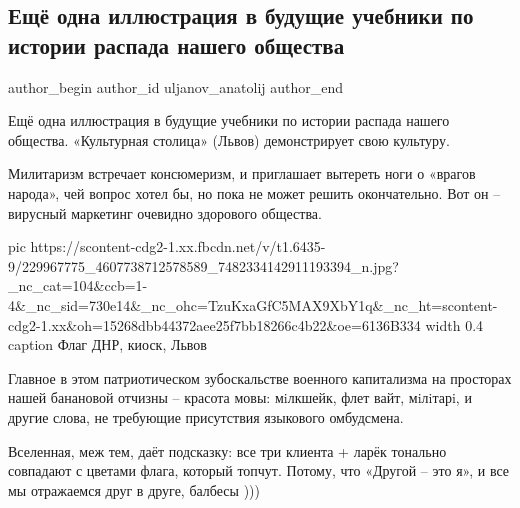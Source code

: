  
 
 
 
 
 
\subsection{Ещё одна иллюстрация в будущие учебники по истории распада нашего общества}
\label{sec:09_08_2021.fb.uljanov_anatolij.1.dnr_flag_lvov}
 
\ifcmt
 author_begin
   author_id uljanov_anatolij
 author_end
\fi

Ещё одна иллюстрация в будущие учебники по истории распада нашего общества.
«Культурная столица» (Львов) демонстрирует свою культуру. 

Милитаризм встречает консюмеризм, и приглашает вытереть ноги о «врагов народа»,
чей вопрос хотел бы, но пока не может решить окончательно. Вот он – вирусный
маркетинг очевидно здорового общества. 

\ifcmt
  pic https://scontent-cdg2-1.xx.fbcdn.net/v/t1.6435-9/229967775_4607738712578589_7482334142911193394_n.jpg?_nc_cat=104&ccb=1-4&_nc_sid=730e14&_nc_ohc=TzuKxaGfC5MAX9XbY1q&_nc_ht=scontent-cdg2-1.xx&oh=15268dbb44372aee25f7bb18266c4b22&oe=6136B334
  width 0.4
	caption Флаг ДНР, киоск, Львов
\fi

Главное в этом патриотическом зубоскальстве военного капитализма на просторах
нашей банановой отчизны – красота мовы: мiлкшейк, флет вайт, мiлiтарi, и другие
слова, не требующие присутствия языкового омбудсмена. 

Вселенная, меж тем, даёт подсказку: все три клиента + ларёк тонально совпадают
с цветами флага, который топчут. Потому, что «Другой – это я», и все мы
отражаемся друг в друге, балбесы )))
